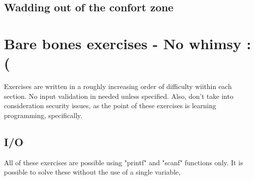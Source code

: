 \documentclass[table]{exam}
\begin{document}
\newpage

\begin{center}
\vspace*{\fill}
\section*{Wadding out of the confort zone}
\vspace*{\fill}
\end{center}

\newpage

\section*{Bare bones exercises - No whimsy :(}

Exercises are written in a roughly increasing order of difficulty wiithin each section. No input validation in needed unless specified. Also, don't take into consideration security issues, as the point of these exercises is learning programming, specifically.


\subsection{I/O}

All of these exercises are possible using "printf" and "scanf" functions only. It is possible to solve these without the use of a single variable, 
\end{document}
